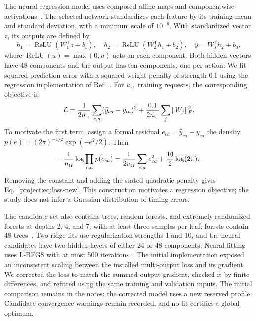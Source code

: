 The neural regression model uses composed affine maps and componentwise activations~\cite{Pedregosa2011Bounds}. The selected network standardizes each feature by its training mean and standard deviation, with a minimum scale of $10^{-6}$. With standardized vector $z$, its outputs are defined by
\begin{equation}
 h_1=\operatorname{ReLU}(W_1^{\mathsf T}z+b_1),\quad
 h_2=\operatorname{ReLU}(W_2^{\mathsf T}h_1+b_2),\quad
 \widehat y=W_3^{\mathsf T}h_2+b_3,
 \label{project:eq:network-new}
\end{equation}
where $\operatorname{ReLU}(u)=\max(0,u)$ acts on each component. Both hidden vectors have 48 components and the output has ten components, one per action. We fit squared prediction error with a squared-weight penalty of strength 0.1 using the regression implementation of Ref.~\cite{Pedregosa2011Bounds}. For $n_{\rm tr}$ training requests, the corresponding objective is
\begin{equation}
 \mathcal L=\frac{1}{2n_{\rm tr}}\sum_{c,a}
 (\widehat y_{ca}-y_{ca})^2+
 \frac{0.1}{2n_{\rm tr}}\sum_j\|W_j\|_F^2.
 \label{project:eq:loss-new}
\end{equation}
To motivate the first term, assign a formal residual $e_{ca}=\widehat y_{ca}-y_{ca}$ the density $p(e)=(2\pi)^{-1/2}\exp(-e^2/2)$. Then
\begin{equation*}
 -\frac{1}{n_{\rm tr}}\log\prod_{c,a}p(e_{ca})
 =\frac{1}{2n_{\rm tr}}\sum_{c,a}e_{ca}^2+\frac{10}{2}\log(2\pi).
\end{equation*}
Removing the constant and adding the stated quadratic penalty gives Eq.~\eqref{project:eq:loss-new}. This construction motivates a regression objective; the study does not infer a Gaussian distribution of timing errors.

The candidate set also contains trees, random forests, and extremely randomized forests at depths 2, 4, and 7, with at least three samples per leaf; forests contain 48 trees~\cite{CART1984,Breiman2001Forest,Geurts2006ExtraTrees}. Two ridge fits use regularization strengths 1 and 10, and the neural candidates have two hidden layers of either 24 or 48 components. Neural fitting uses L-BFGS with at most 500 iterations~\cite{Pedregosa2011Bounds}. The initial implementation exposed an inconsistent scaling between the installed multi-output loss and its gradient. We corrected the loss to match the summed-output gradient, checked it by finite differences, and refitted using the same training and validation inputs. The initial comparison remains in the notes; the corrected model uses a new reserved profile. Candidate convergence warnings remain recorded, and no fit certifies a global optimum.

